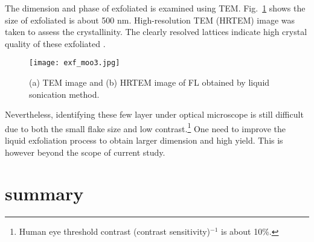 The dimension and phase of exfoliated  is examined using TEM. Fig.~\ref{fig:motem} shows the size of exfoliated  is about 500 nm. High-resolution TEM (HRTEM) image was taken to assess the  crystallinity. The clearly resolved lattices indicate high crystal quality of these exfoliated .

\begin{figure}[htb]
\centering
\texttt{[image: exf\_moo3.jpg]}
\caption[TEM images of exfoliated ]{(a) TEM image and (b) HRTEM image of FL  obtained by liquid sonication method.}
\label{fig:motem}
\end{figure}

Nevertheless, identifying these few layer  under optical microscope is still difficult due to both the small flake size and low contrast.\footnote{Human eye threshold contrast (contrast sensitivity)$^{-1}$ is about 10\%.} One need to improve the liquid exfoliation process to obtain larger dimension and high yield. This is however beyond the scope of current study.

\section{summary}

